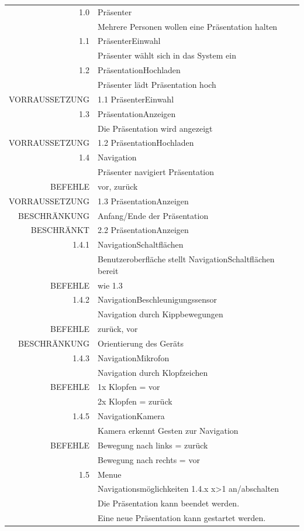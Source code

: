 \begin{tabular}{|r|l|}
	\hline
	1.0 & Präsenter \\
	 & Mehrere Personen wollen eine Präsentation halten \\
	\hline
	\hline
	1.1 & PräsenterEinwahl\\
	& Präsenter wählt sich in das System ein\\
	\hline
	\hline
	1.2 & PräsentationHochladen\\
	& Präsenter lädt Präsentation hoch\\
	VORRAUSSETZUNG & 1.1 PräsenterEinwahl\\
	\hline
	\hline
	1.3 & PräsentationAnzeigen\\
	& Die Präsentation wird angezeigt\\
	VORRAUSSETZUNG & 1.2 PräsentationHochladen\\
	\hline
	\hline
	1.4 & Navigation\\
	& Präsenter navigiert Präsentation\\
	BEFEHLE & vor, zurück\\
	VORRAUSSETZUNG & 1.3 PräsentationAnzeigen\\
	BESCHRÄNKUNG & Anfang/Ende der Präsentation\\
	BESCHRÄNKT & 2.2 PräsentationAnzeigen\\
	\hline
	\hline
	1.4.1 & NavigationSchaltflächen\\
	& Benutzeroberfläche stellt NavigationSchaltflächen bereit\\
	BEFEHLE & wie 1.3\\
	\hline
	\hline
	1.4.2 & NavigationBeschleunigungssensor\\
	& Navigation durch Kippbewegungen\\
	BEFEHLE & zurück, vor\\
	BESCHRÄNKUNG & Orientierung des Geräts\\
	\hline
	\hline
	1.4.3 & NavigationMikrofon\\
	& Navigation durch Klopfzeichen\\
	BEFEHLE & 1x Klopfen = vor\\
	& 2x Klopfen = zurück\\
	\hline
	\hline
	1.4.5 & NavigationKamera\\
	& Kamera erkennt Gesten zur Navigation\\
	BEFEHLE & Bewegung nach links = zurück\\
	& Bewegung nach rechts = vor\\
	\hline
	\hline
	1.5 & Menue\\
	& Navigationsmöglichkeiten 1.4.x x>1 an/abschalten\\
	& Die Präsentation kann beendet werden.\\
	& Eine neue Präsentation kann gestartet werden.\\
	\hline
\end{tabular}

